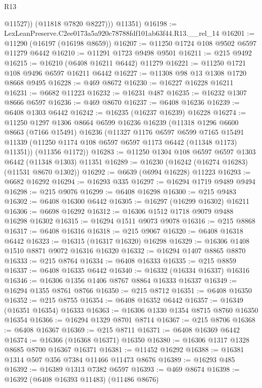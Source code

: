 \begin{lexlean}{R13}
\begin{coremodule}
              @11527))
          (@11818 @7820 @8227)))
      @11351)
@16198 := LexLeanPreserve.C2ee0173a5a920c78788fdf101ab63f44.R13.__rel_14
@16201 := @11290 (@16197 (@16198 @8659))
@16207 := @11250 @1724 @108 @9502 @6597 @11279 @6442
@16210 := @11291 @1723 @9498 @9501
@16211 := @215 @9492
@16215 := @16210 (@6408 @16211 @6442) @11279
@16221 := @11250 @1721 @108 @9496 @6597 @16211 @6442
@16227 := @11308 @98 @13 @1308 @1720 @8668 @9495
@16228 := @469 @8672
@16230 := @16227 @16228 @16211
@16231 := @6682 @11223
@16232 := @16231 @487
@16235 := @16232 @1307 @8666 @6597
@16236 := @469 @8670
@16237 := @6408 @16236
@16239 := @6408 @1303 @6442
@16242 := @16235 (@16237 @16239) @16228
@16274 := @11250
    @1297
    @1306
    @8664
    @6599
    @16236
    @16239
    (@11318
      @1296
      @6600
      @8663
      (@7166 @15491)
      @16236
      (@11327
        @1176
        @6597
        @6599
        @7165
        @15491
        @11339
        (@11250 @1174 @108 @6597 @6597 @1173 @6442 (@11348 @1173) @11351))
      (@11356 @1172))
@16283 := @11250 @1304 @108 @6597 @6597 @1303 @6442 (@11348 @1303) @11351
@16289 := @16230 (@16242 (@16274 @16283) (@11531 @8670 @1302))
@16292 := @6639 (@6994 @16228) @11223
@16293 := @6682 @16292
@16294 := @16293 @335
@16297 := @16294 @1719 @9489 @9494
@16298 := @215 @9076
@16299 := @6408 @16298
@16300 := @215 @9483
@16302 := @6408 @16300 @6442
@16305 := @16297 (@16299 @16302) @16211
@16306 := @6698 @16292
@16312 := @16306 @1512 @1718 @9079 @9488 @16298 @16302
@16315 := @16294 @1511 @9073 @9078
@16316 := @215 @8868
@16317 := @6408 @16316
@16318 := @215 @9067
@16320 := @6408 @16318 @6442
@16323 := @16315 (@16317 @16320) @16298
@16329 := @16306 @1408 @1510 @8871 @9072 @16316 @16320
@16332 := @16294 @1407 @8865 @8870
@16333 := @215 @8764
@16334 := @6408 @16333
@16335 := @215 @8859
@16337 := @6408 @16335 @6442
@16340 := @16332 (@16334 @16337) @16316
@16346 := @16306 @1356 @1406 @8767 @8864 @16333 @16337
@16349 := @16294 @1355 @8761 @8766
@16350 := @215 @8712
@16351 := @6408 @16350
@16352 := @215 @8755
@16354 := @6408 @16352 @6442
@16357 := @16349 (@16351 @16354) @16333
@16363 := @16306 @1330 @1354 @8715 @8760 @16350 @16354
@16366 := @16294 @1329 @8701 @8714
@16367 := @215 @8706
@16368 := @6408 @16367
@16369 := @215 @8711
@16371 := @6408 @16369 @6442
@16374 := @16366 (@16368 @16371) @16350
@16380 := @16306 @1317 @1328 @8685 @8700 @16367 @16371
@16381 := @11452 @16292
@16388 := @16381 @1314 @507 @356 @7384 @11466 @11473 @8676
@16389 := @16293 @485
@16392 := @16389 @1313 @7382 @6597
@16393 := @469 @8674
@16398 := @16392 (@6408 @16393 @11483) (@11486 @8676)

\end{coremodule}
\end{lexlean}
